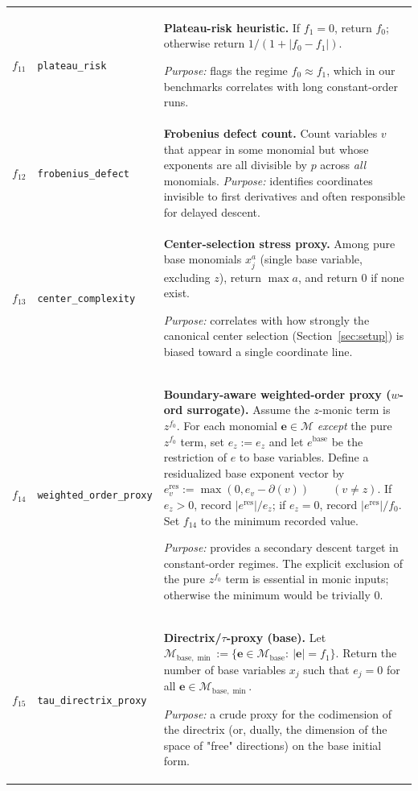 \documentclass[11pt]{amsart}
\begin{document}
\begin{longtable}{@{}r p{} p{}@{}}
$f_{11}$ &
\texttt{plateau\_risk} &
\textbf{Plateau-risk heuristic.}
If $f_1=0$, return $f_0$; otherwise return $1/(1+|f_0-f_1|)$.

\emph{Purpose:} flags the regime $f_0\approx f_1$, which in our benchmarks correlates with long constant-order runs. \\[0.3em]

$f_{12}$ &
\texttt{frobenius\_defect} &
\textbf{Frobenius defect count.}
Count variables $v$ that appear in some monomial but whose exponents are all divisible by $p$ across \emph{all} monomials.
\emph{Purpose:} identifies coordinates invisible to first derivatives and often responsible for delayed descent. \\[0.3em]

$f_{13}$ &
\texttt{center\_complexity} &
\textbf{Center-selection stress proxy.}
Among pure base monomials $x_j^{a}$ (single base variable, excluding $z$), return $\max a$, and return $0$ if none exist.

\emph{Purpose:} correlates with how strongly the canonical center selection (Section~\ref{sec:setup}) is biased toward a
single coordinate line. \\[0.3em]

$f_{14}$ &
\texttt{weighted\_order\_proxy} &
\textbf{Boundary-aware weighted-order proxy ($w$-ord surrogate).} Assume the $z$-monic term is $z^{f_0}$. 
For each monomial $\mathbf{e}\in\mathcal M$ \emph{except} the pure $z^{f_0}$ term, set $e_z:=e_z$ and let $e^{\mathrm{base}}$
be the restriction of $e$ to base variables.
Define a residualized base exponent vector by
$
e^{\mathrm{res}}_v:=\max(0,e_v-\partial(v))\qquad (v\neq z).
$
If $e_z>0$, record $|e^{\mathrm{res}}|/e_z$; if $e_z=0$, record $|e^{\mathrm{res}}|/f_0$.
Set $f_{14}$ to the minimum recorded value.

\emph{Purpose:} provides a secondary descent target in constant-order regimes. The explicit exclusion of the pure
$z^{f_0}$ term is essential in monic inputs; otherwise the minimum would be trivially $0$. \\[0.3em]

$f_{15}$ &
\texttt{tau\_directrix\_proxy} &
\textbf{Directrix/$\tau$-proxy (base).}
Let $\mathcal M_{\mathrm{base},\min}:=\{\mathbf{e}\in\mathcal M_{\mathrm{base}}:\ |\mathbf{e}|=f_1\}$.
Return the number of base variables $x_j$ such that $e_j=0$ for all $\mathbf{e}\in\mathcal M_{\mathrm{base},\min}$.

\emph{Purpose:} a crude proxy for the codimension of the directrix (or, dually, the dimension of the space of
"free" directions) on the base initial form. \\[0.3em]


\end{longtable}
\end{document}
